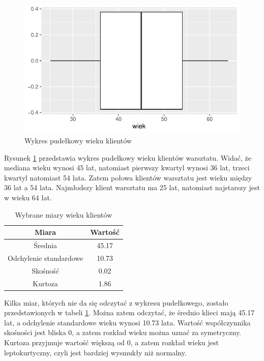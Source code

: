 \documentclass{article}\usepackage[]{graphicx}\usepackage[]{xcolor}
\makeatletter
\def\maxwidth{ %
  \ifdim\Gin@nat@width>\linewidth
    \linewidth
  \else
    \Gin@nat@width
  \fi
}
\newenvironment{knitrout}{}{} %
\makeatother
\begin{document}
\begin{knitrout}
\color{fgcolor}\begin{figure}[H]

{\centering \includegraphics[width=\maxwidth]{figure/fig_wiek-1} 

}

\caption[Wykres pudełkowy wieku klientów]{Wykres pudełkowy wieku klientów}\label{fig:fig_wiek}
\end{figure}

\end{knitrout}

Rysunek \ref{fig:fig_wiek} przedstawia wykres pudełkowy wieku klientów warsztatu. Widać, że mediana wieku wynosi 45 lat, natomiast pierwszy kwartyl wynosi 36 lat, trzeci kwartyl natomiast 54 lata. Zatem połowa klientów warsztatu jest wieku między 36 lat a 54 lata.
Najmłodszy klient warsztatu ma 25 lat, natomiast najstarszy jest w wieku 64 lat.



\begin{table}[H]
\centering
\begin{tabular}{c|c} \hline
Miara & Wartość \\ \hline
Średnia & 45.17 \\ 
Odchylenie standardowe & 10.73 \\
Skośność & 0.02  \\ 
Kurtoza & 1.86 \\ \hline
\end{tabular}
\caption{Wybrane miary wieku klientów}
\label{tab_wiek}
\end{table}

Kilka miar, których nie da się odczytać z wykresu pudełkowego, zostało przedstawionych w tabeli \ref{tab_wiek}. Można zatem odczytać, że średnio klieci mają 45.17 lat, a odchylenie standardowe wieku wynosi 10.73 lata. Wartość współczynnika skośności jest bliska 0, a zatem rozkład wieku można uznać za symetryczny. Kurtoza przyjmuje wartość większą od 0, a zatem rozkład wieku jest leptokurtyczny, czyli jest bardziej wysmukły niż normalny.
\end{document}
